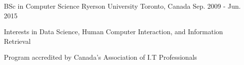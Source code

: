 \begin{cventries}
  \cventry
    {BSc in Computer Science}
    {Ryerson University}
    {Toronto, Canada}
    {Sep. 2009 - Jun. 2015}
    {
      \begin{cvitems}
        \item {Interests in Data Science, Human Computer Interaction, and Information Retrieval}
        \item {Program accredited by Canada's Association of I.T Professionals}
      \end{cvitems}
    }
\end{cventries}
